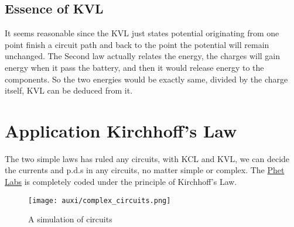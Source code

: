 \documentclass[a4paper]{tufte-handout}
\begin{document}
\subsection{Essence of KVL}
It seems reasonable since the KVL just states potential originating from one point finish a circuit path and back to the point the potential will remain unchanged. The Second law actually relates the energy, the charges will gain energy when it pass the battery, and then it would release energy to the components. So the two energies would be exactly same, divided by the charge itself, KVL can be deduced from it.


\section{Application Kirchhoff's Law}
The two simple laws has ruled any circuits, with KCL and KVL, we can decide the currents and p.d.s in any circuits, no matter simple or complex. The \href{https://phet.colorado.edu/sims/html/circuit-construction-kit-ac-virtual-lab/latest/circuit-construction-kit-ac-virtual-lab_en.html}{Phet Labs} is completely coded under the principle of Kirchhoff's Law.
\begin{figure}
\centering
\texttt{[image: auxi/complex\_circuits.png]}
\caption{A simulation of circuits}
\end{figure}
\end{document}
